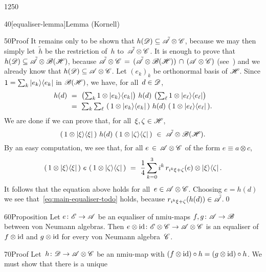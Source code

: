 \begin{parsec}{1250}
\begin{point}{40}[equaliser-lemma]{Lemma (Kornell)}
\begin{point}{50}{Proof}
It remains only to 
be shown that $h(\mathscr{D}) \subseteq \tilde{\mathscr{A}}\otimes \mathscr{C}$,
because we may then simply let~$\tilde{h}$
be the restriction of~$h$ to~$\tilde{\mathscr{A}}\otimes \mathscr{C}$.
It is enough to prove that
$h(\mathscr{D}) \subseteq \tilde{\mathscr{A}} 
\otimes  \mathscr{B}(\mathscr{H})$,
because 
$\tilde{\mathscr{A}} \otimes  \mathscr{C}
\,=\, (\tilde{\mathscr{A}}\otimes \mathscr{B}(\mathscr{H}))\,\cap\,
(\mathscr{A}\otimes \mathscr{C})$
(see~)
and we already know that $h(\mathscr{D})\subseteq \mathscr{A}\otimes \mathscr{C}$.
Let $(e_k)_k$ be orthonormal basis of $\mathscr{H}$.
Since $1= \sum_k \ket{e_k}\!\bra{e_k}$
in $\mathscr{B}(\mathscr{H})$,
we have, for all~$d\in\mathscr{D}$,
\begin{align*}
h(d) \ &=\ \textstyle\bigl(\sum_k 1\otimes \ket{e_k}\!\bra{e_k}\bigr)
\ h(d)\ \bigl(\sum_\ell 1\otimes \ket{e_\ell}\!\bra{e_\ell}\bigr)\\
\ &=\ \textstyle \sum_k\sum_\ell\ 
 (\,1\otimes \ket{e_k}\!\bra{e_k}\,) \ h(d)\  
 (\,1\otimes \ket{e_\ell}\!\bra{e_\ell}\,).
\end{align*}
We are done
if we can prove that,
for all~$\xi,\zeta\in\mathscr{H}$,
\begin{equation}
\label{eq:main-equaliser-todo}
(\,1\otimes \ket{\xi}\!\bra{\xi}\,) \ 
h(d)\  (\,1\otimes \ket{\zeta}\!\bra{\zeta}\,)
\ \in\ \tilde\scrA\otimes \bsp(\scrH).
\end{equation}
By an easy computation, we see that,
for all $e \,\in\,\mathscr{A}\otimes \mathscr{C}$
	of the form $e\equiv a\otimes c$,
\begin{equation*}
\label{eq:polarisation-equaliser}
(\,1\otimes \ket{\xi}\!\bra{\xi}\,) \ e
\  (\,1\otimes \ket{\zeta}\!\bra{\zeta}\,)
\ =\ 
\frac{1}{4}\sum_{k=0}^3i^k \,r_{i^k\xi+\zeta}(e)\otimes \ket\xi\!\bra\zeta.
\end{equation*}
It follows that the equation above holds for all~$e\in \mathscr{A}\otimes \mathscr{C}$.
Choosing $e=h(d)$
we see that~\eqref{eq:main-equaliser-todo}
holds,
because
$r_{i^k\xi+\zeta}(h(d)) \in\tilde{\mathscr{A}}$.\qed
\end{point}
\end{point}
\begin{point}{60}{Proposition}%
Let $e\colon\mathscr{E}\to\mathscr{A}$ be an equaliser of
nmiu-maps $f,g\colon\mathscr{A}\to\mathscr{B}$ 
between von Neumann algebras.
Then $e\otimes\mathrm{id}\colon\mathscr{E}\otimes\mathscr{C}\to\mathscr{A}\otimes\mathscr{C}$
is an equaliser of 
$f\otimes\mathrm{id}$ and $g\otimes\mathrm{id}$
for every von Neumann algebra~$\mathscr{C}$.
\begin{point}{70}{Proof}%
Let~$h\colon\mathscr{D}\to\mathscr{A}\otimes \mathscr{C}$
be an nmiu-map 
with $(f\otimes\mathrm{id})\circ h=(g\otimes\mathrm{id})\circ h$.
We must show that there is a unique

\end{point}
\end{point}
\end{parsec}
